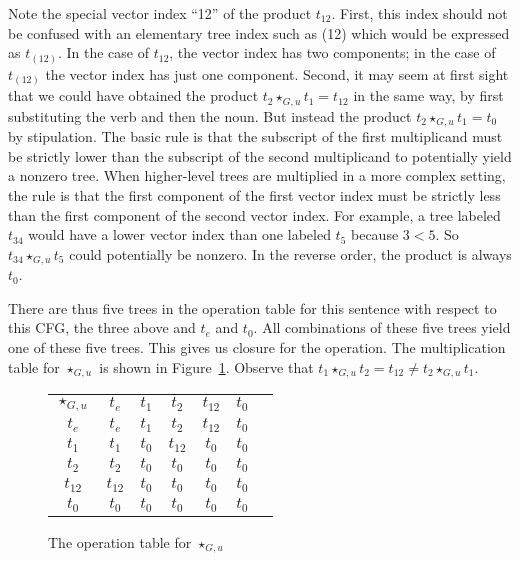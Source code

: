 Note the special vector index ``12'' of the product $t_{12}$. First, this index should not be confused with an elementary tree index such as (12) which would be expressed as $t_{(12)}$. In the case of $t_{12}$, the vector index has two components; in the case of $t_{(12)}$ the vector index has just one component. Second, it may seem at first sight that we could have obtained the product $t_2 \star_{G,u} t_1 = t_{12}$ in the same way, by first substituting the verb and then the noun. But instead the product $t_2 \star_{G,u} t_1 = t_0$ by stipulation. The basic rule is that the subscript of the first multiplicand must be strictly lower than the subscript of the second multiplicand to potentially yield a nonzero tree. When higher-level trees are multiplied in a more complex setting, the rule is that the first component of the first vector index must be strictly less than the first component of the second vector index. For example, a tree labeled $t_{34}$ would have a lower vector index than one labeled $t_{5}$ because $3 < 5$. So $t_{34} \star_{G,u} t_5$ could potentially be nonzero. In the reverse order, the product is always $t_0$.

There are thus five trees in the operation table for this sentence with respect to this CFG, the three above and $t_e$ and $t_0$. All combinations of these five trees yield one of these five trees. This gives us closure for the operation. The  multiplication table for $\star_{G,u}$ is shown in Figure~\ref{fig:operation table}. Observe that $t_1 \star_{G,u} t_2 = t _{12} \neq t_2 \star_{G,u} t_1$.

\begin{figure}
\renewcommand{\arraystretch}{1.5}
\begin{tabular}{c|c|c|c|c|c|c}
\multicolumn{1}{c}{$\star_{G,u}$} & \multicolumn{1}{c}{$t_e$} & \multicolumn{1}{c}{$t_1$} & \multicolumn{1}{c}{$t_2$} & \multicolumn{1}{c}{$t_{12}$} & \multicolumn{1}{c}{$t_0$} \\[.5ex] \cline{2-6}
$t_e$ & $t_e$ & $t_1$ & $t_2$ & $t_{12}$ & $t_0$ & \qquad \\[.5ex] \cline{2-6}
$t_1$ & $t_1$ & $t_0$ & $t_{12}$ & $t_0$ & $t_0$ & \qquad \\[.5ex] \cline{2-6}
$t_2$ & $t_2$ & $t_0$ & $t_0$ & $t_0$ & $t_0$ & \qquad \\[.5ex] \cline{2-6}
$t_{12}$ & $t_{12}$ & $t_0$ & $t_0$ & $t_0$ & $t_0$ & \qquad \\[.5ex] \cline{2-6}
$t_0$ & $t_0$ & $t_0$ & $t_0$ & $t_0$ & $t_0$ & \qquad \\[.5ex] \cline{2-6}
\end{tabular}
\caption{The operation table for $\star_{G,u}$} \label{fig:operation table}
\end{figure}



